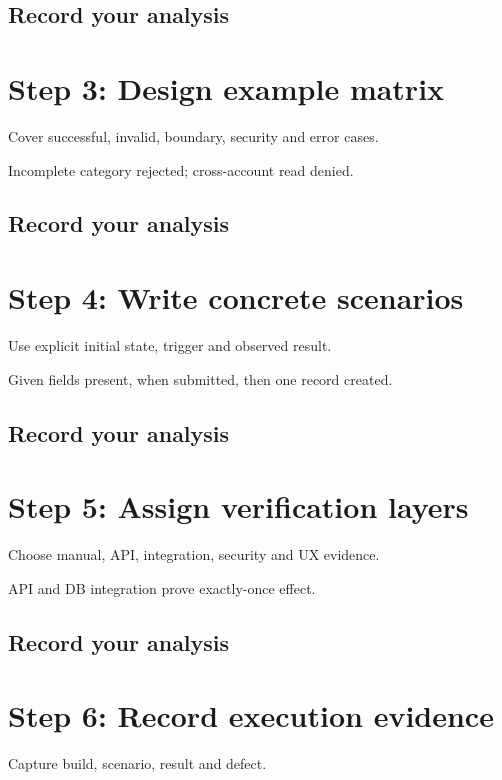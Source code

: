 \documentclass[11pt,letterpaper]{article}
\begin{document}
\subsection{Record your analysis}
\section{Step 3: Design example matrix}
Cover successful, invalid, boundary, security and error cases.

\begin{tcolorbox}[colback=tealback,colframe=navy,title={Illustration},breakable]
Incomplete category rejected; cross-account read denied.

\end{tcolorbox}
\subsection{Record your analysis}
\section{Step 4: Write concrete scenarios}
Use explicit initial state, trigger and observed result.

\begin{tcolorbox}[colback=tealback,colframe=navy,title={Illustration},breakable]
Given fields present, when submitted, then one record created.

\end{tcolorbox}
\subsection{Record your analysis}
\section{Step 5: Assign verification layers}
Choose manual, API, integration, security and UX evidence.

\begin{tcolorbox}[colback=tealback,colframe=navy,title={Illustration},breakable]
API and DB integration prove exactly-once effect.

\end{tcolorbox}
\subsection{Record your analysis}
\section{Step 6: Record execution evidence}
Capture build, scenario, result and defect.
\end{document}

